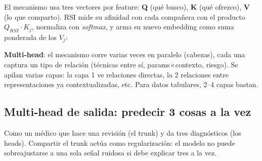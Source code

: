 \documentclass[11pt,a4paper]{article}
\begin{document}
El mecanismo usa tres vectores por feature: \textbf{Q} (qué busco), \textbf{K} (qué ofrezco),
\textbf{V} (lo que comparto). RSI mide su afinidad con cada compañera con el producto
$Q_{RSI}\cdot K_j$, normaliza con \emph{softmax}, y arma su nuevo embedding como suma
ponderada de los $V_j$:

\begin{center}
\end{center}

\textbf{Multi-head}: el mecanismo corre varias veces en paralelo (cabezas), cada una captura un
tipo de relación (técnicas entre sí, params$\times$contexto, riesgo). Se apilan varias capas:
la capa 1 ve relaciones directas, la 2 relaciones entre representaciones ya contextualizadas,
etc. Para datos tabulares, 2--4 capas bastan.

\subsection{Multi-head de salida: predecir 3 cosas a la vez}

\begin{center}
\end{center}

Como un médico que hace una revisión (el trunk) y da tres diagnósticos (los heads). Compartir
el trunk actúa como regularización: el modelo no puede sobreajustarse a una sola señal ruidosa
si debe explicar tres a la vez.
\end{document}
